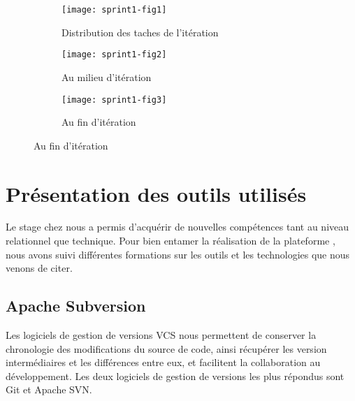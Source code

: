\begin{figure}[htbp]
    \centering
    \caption{Évolution du travail}
    \label{}
    \begin{subfigure}{1\textwidth}
        \centering
        \texttt{[image: sprint1-fig1]}
        \caption{Distribution des taches de l'itération}
        \label{fig:sprint1-fig1}
    \end{subfigure}

    \begin{subfigure}{1\textwidth}
        \centering
        \texttt{[image: sprint1-fig2]}
        \caption{Au milieu d'itération}
        \label{fig:sprint1-fig2}
    \end{subfigure}

    \begin{subfigure}{1\textwidth}
        \centering
        \texttt{[image: sprint1-fig3]}
        \caption{Au fin d'itération}
        \label{fig:sprint1-fig3}
    \end{subfigure}
\end{figure}
\clearpage

\section{Présentation des outils utilisés}

Le stage chez  nous a permis d'acquérir de nouvelles
compétences tant au niveau relationnel que technique. Pour bien entamer la
réalisation de la plateforme , nous avons suivi
différentes formations sur les outils et les technologies que nous venons de
citer.

\subsection{Apache Subversion}

Les logiciels de gestion de versions \acrshort{VCS} nous permettent de
conserver la chronologie des modifications du source de code, ainsi récupérer
les version intermédiaires et les différences entre eux, et facilitent la
collaboration au développement. Les deux logiciels de gestion de versions les
plus répondus sont Git et Apache SVN\@.

